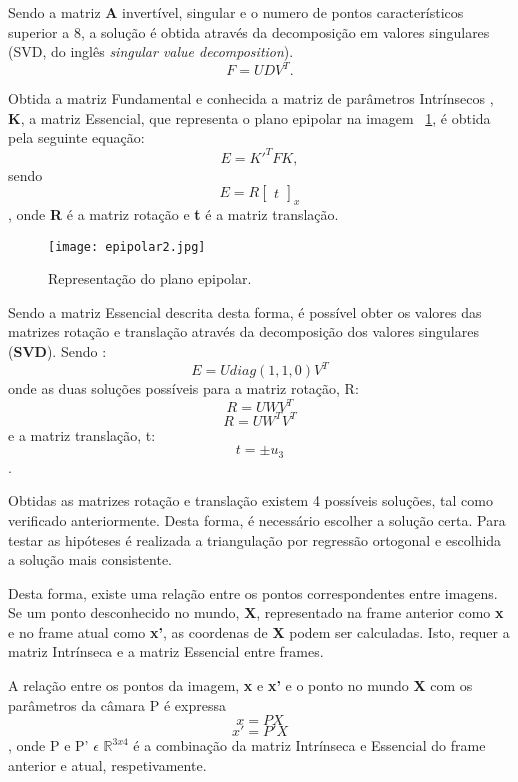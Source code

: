 Sendo a matriz \textbf{A} invertível, singular  e o numero de pontos característicos superior a 8, a solução é obtida através da decomposição em valores singulares (SVD, do inglês \textit{singular value decomposition}).  \[ F = U D V^{T}.\]


Obtida a matriz Fundamental e conhecida a matriz de parâmetros Intrínsecos , \textbf{K}, a matriz Essencial, que representa o plano epipolar na imagem ~\ref{fig:esseciallinemat}, é obtida pela seguinte equação:
\[ E = {K}'^{T} F K, \]  sendo \[ E = R \left[\begin{array}{c}
t
\end{array}\right]_{x} \], onde \textbf{R} é a matriz rotação e \textbf{t} é a matriz translação.

\begin{figure}[h!] %
	\begin{center}
		\leavevmode		
		\texttt{[image: epipolar2.jpg]}
		\caption{Representação do plano epipolar.}
		\label{fig:esseciallinemat}
	\end{center}
\end{figure}

Sendo a matriz Essencial descrita desta forma, é possível obter os valores das matrizes rotação e translação através da decomposição dos valores singulares (\textbf{SVD}). Sendo : \[ E = U diag(1,1,0) V^{T} \] onde as duas soluções possíveis para a matriz rotação, R: \[ R = UWV^T \] \[ R = UW^TV^T \] e a matriz translação, t: \[ t = \pm u_3 \].


Obtidas as matrizes rotação e translação existem 4 possíveis soluções, tal como verificado anteriormente. Desta forma, é necessário escolher a solução certa. Para testar as hipóteses é realizada a triangulação por regressão ortogonal e escolhida a solução mais consistente.

Desta forma, existe uma relação entre os pontos correspondentes entre imagens. Se um ponto desconhecido no mundo, \textbf{X}, representado na frame anterior como \textbf{x} e no frame atual como \textbf{x'}, as coordenas de \textbf{X} podem ser calculadas. Isto, requer a matriz Intrínseca e a matriz Essencial entre frames.

A relação entre os pontos da imagem, \textbf{x} e \textbf{x'} e o ponto no mundo \textbf{X} com os parâmetros da câmara P é expressa \[ x = P X \] \[ x' = P'X \], onde P e P' $\epsilon$  $\mathbb{R}^{3x4}$ é a combinação da matriz Intrínseca e Essencial do frame anterior e atual, respetivamente.

